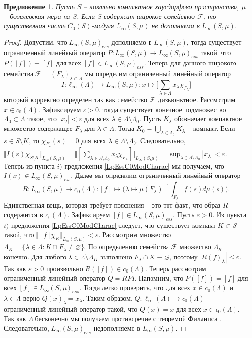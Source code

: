 \documentclass[12pt]{article}
\newtheorem{proposition}[theorem]{Предложение}
\begin{document}
\begin{proposition}\label{LInfEssNotCompl} Пусть $S$ -- локально компактное хаусдорфово пространство, $\mu$ -- борелевская мера на $S$. Если $S$ содержит широкое семейство $\mathcal{F}$, то существенная часть $C_0(S)$-модуля $L_\infty(S,\mu)$ не дополняема в $L_\infty(S,\mu)$.
\end{proposition}
\begin{proof} Допустим, что $L_\infty(S,\mu)_{ess}$ дополняемо в $L_\infty(S,\mu)$, тогда существует ограниченный линейный оператор $P:L_\infty(S,\mu)\to L_\infty(S,\mu)_{ess}$ такой, что $P([f])=[f]$ для всех $[f]\in L_\infty(S,\mu)_{ess}$. Теперь для данного широкого семейства $\mathcal{F}=(F_\lambda)_{\lambda\in\Lambda}$ мы определим ограниченный линейный оператор
    $$
        I:\ell_\infty(\Lambda)\to L_\infty(S,\mu): x\mapsto \biggl[\sum_{\lambda\in\Lambda}x_\lambda \chi_{F_\lambda}\biggr]
    $$
    который корректно определен так как семейство $\mathcal{F}$ дизъюнктное. Рассмотрим $x\in c_0(\Lambda)$. Зафиксируем $\varepsilon > 0$, тогда существует конечное подмножество $\Lambda_0\subset\Lambda$ такое, что $|x_\lambda|<\varepsilon$ для всех $\lambda\in\Lambda\setminus\Lambda_0$. Пусть $K_\lambda$ обозначает компактное множество содержащее $F_\lambda$ для $\lambda\in\Lambda$. Тогда $K_0=\bigcup_{\lambda\in\Lambda_0}K_\lambda$ -- компакт. Если $s\in S\setminus K$, то $\chi_{F_\lambda}(s)=0$ для всех $\lambda\in\Lambda\setminus\Lambda_0$. Следовательно, $\Vert I(x)\chi_{S\setminus K}\Vert_{L_\infty(S,\mu)}=\Vert[\sum_{\lambda\in\Lambda\setminus\Lambda_0}x_\lambda\chi_{F_\lambda}] \Vert_{L_\infty(S,\mu)}=\sup_{\lambda\in\Lambda\setminus\Lambda_0}|x_\lambda|<\varepsilon$. Теперь из пункта $i)$ предложения \ref{LpEssC0ModCharac} мы получаем, что $I(x)\in L_\infty(S,\mu)_{ess}$. Далее мы определим ограниченный линейный оператор
    $$
        R:L_\infty(S,\mu)\to c_0(\Lambda): [f]\mapsto \biggl(\lambda\mapsto\mu(F_\lambda)^{-1}\int_{F_\lambda} f(s)d\mu(s)\biggr).
    $$
    Единственная вещь, которая требует пояснения -- это тот факт, что образ $R$ содержится в $c_0(\Lambda)$. Зафиксируем $[f]\in L_\infty(S,\mu)_{ess}$. Пусть $\varepsilon>0$. Из пункта $i)$ предложения \ref{LpEssC0ModCharac} следует, что существует компакт $K\subset S$ такой, что $\Vert [f]\chi_{K}\Vert_{L_\infty(S,\mu)}<\varepsilon$. Рассмотрим множество $\Lambda_K=\{\lambda\in\Lambda: K\cap F_\lambda\neq\varnothing\}$. По определению семейства $\mathcal{F}$ множество $\Lambda_K$ конечно. Для любого $\lambda\in\Lambda\setminus \Lambda_K$ выполнено $F_\lambda\cap K=\varnothing$, поэтому $|R(f)_\lambda|\leq\varepsilon$. Так как $\varepsilon>0$ произвольно $R([f])\in c_0(\Lambda)$. Теперь рассмотрим ограниченный линейный оператор $Q=RPI$. Напомним, что $P([f])=[f]$ для всех $[f]\in L_\infty(S,\mu)_{ess}$. Тогда легко проверить, что для всех $x\in c_0(\Lambda)$ и $\lambda\in\Lambda$ верно $Q(x)_\lambda=x_\lambda$. Таким образом, $Q:\ell_\infty(\Lambda)\to c_0(\Lambda)$ -- ограниченный линейный оператор такой, что $Q(x)=x$ для всех $x\in c_0(\Lambda)$. Так как $\Lambda$ бесконечно мы получаем противоречие с теоремой Филлипса \cite{PhilOnLinTran}. Следовательно, $L_\infty(S,\mu)_{ess}$ недополняемо в $L_\infty(S,\mu)$.
\end{proof}
\end{document}
